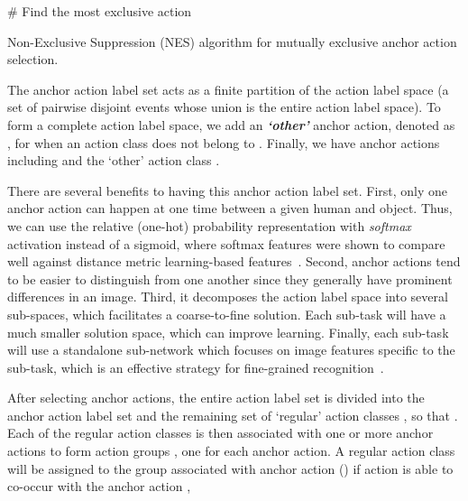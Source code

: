 \begin{algorithm}[ht]
\KwIn{
\;
}
\KwOut{

} 
\Begin
{
    \;
{
    \# Find the most exclusive action\;
    \;
  \;
  }
}
\caption{
{Non-Exclusive Suppression (NES) algorithm for mutually exclusive anchor action selection.
}
}
\label{alg:correlation}
\end{algorithm}


The anchor action {label} set acts as a finite partition of the action {label} space (a set of pairwise disjoint events whose union is the entire action {label} space). To form a complete action {label} space, we add an \emph{\textbf{`other'}} anchor action, denoted as , for when an action {class} does not belong to . 
Finally, we have  anchor actions including  and the `other' action {class} . 







There are several benefits to having this anchor action {label} set.
First, only one anchor action can happen at one time between a given human and object. Thus, we can use the relative (one-hot) probability representation with \emph{softmax} activation instead of a sigmoid, where softmax features were shown to compare well against distance metric learning-based features~\cite{horiguchi2019significance}.
Second, anchor actions tend to be easier to distinguish from one another since they generally have prominent differences in an image.
Third, it decomposes the action {label} space into several sub-spaces, which facilitates a coarse-to-fine solution. Each sub-task will have a much smaller solution space, which can improve learning.
Finally, each sub-task will use a standalone sub-network which focuses on image features specific to the sub-task, which is an effective strategy for fine-grained recognition~\cite{fu2017look}.







After selecting anchor actions, the entire action {label} set  is divided into the anchor action {label} set  and the remaining set of `regular' action {classes} , so that .
Each of the regular action {classes} is then associated with one or more anchor actions to form  action groups , one for each anchor action. 
A regular action {class}  will be assigned to the group associated with anchor action  () if action  is able to co-occur with the anchor action ,

